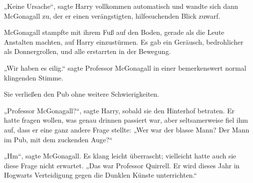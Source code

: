 „Keine Ursache“, sagte Harry vollkommen automatisch und wandte sich dann McGonagall zu, der er einen verängstigten, hilfesuchenden Blick zuwarf.

McGonagall stampfte mit ihrem Fuß auf den Boden, gerade als die Leute Anstalten machten, auf Harry einzustürmen. Es gab ein Geräusch, bedrohlicher als Donnergrollen, und alle erstarrten in der Bewegung.

„Wir haben es eilig.“ sagte Professor McGonagall in einer bemerkenswert normal klingenden Stimme.

Sie verließen den Pub ohne weitere Schwierigkeiten.

„Professor McGonagall?“, sagte Harry, sobald sie den Hinterhof betraten. Er hatte fragen wollen, was genau drinnen passiert war, aber seltsamerweise fiel ihm auf, dass er eine ganz andere Frage stellte:
„Wer war der blasse Mann? Der Mann im Pub, mit dem zuckenden Auge?“

„Hm“, sagte McGonagall. Es klang leicht überrascht; vielleicht hatte auch sie diese Frage nicht erwartet.
„Das war Professor Quirrell. Er wird dieses Jahr in Hogwarts Verteidigung gegen die Dunklen Künste unterrichten.“

